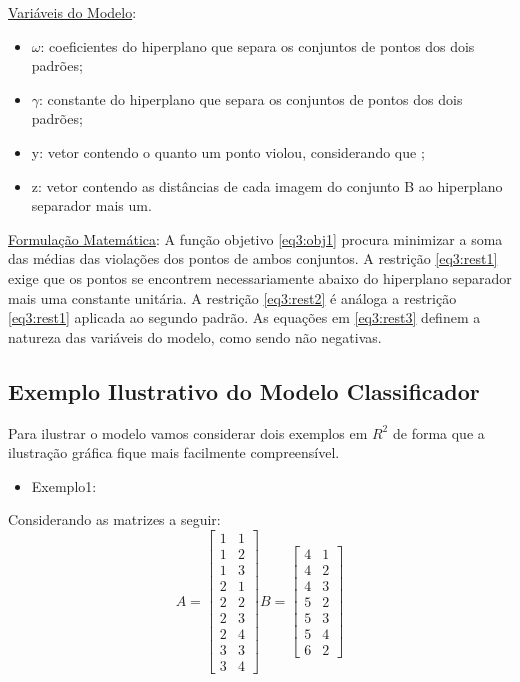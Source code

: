 \underline{Variáveis do Modelo}:
\begin{itemize}
\item{$\omega$}: coeficientes do hiperplano que separa os conjuntos de pontos dos dois padrões;
\item{$\gamma$}: constante do hiperplano que separa os conjuntos de pontos dos dois padrões;
\item{y}: vetor contendo o quanto um ponto violou, considerando que  ;
\item{z}: vetor contendo as distâncias de cada imagem do conjunto B ao hiperplano separador mais um.
\end{itemize}

\underline{Formulação Matemática}:
A função objetivo \ref{eq3:obj1} procura minimizar a soma das médias das violações dos pontos de ambos conjuntos. A restrição \ref{eq3:rest1} exige que os pontos se encontrem necessariamente abaixo do hiperplano separador mais uma constante unitária.  A restrição \ref{eq3:rest2} é análoga a restrição \ref{eq3:rest1} aplicada ao segundo padrão. As equações em \ref{eq3:rest3} definem a natureza das variáveis do modelo, como sendo não negativas.

\subsection{Exemplo Ilustrativo do Modelo Classificador}
Para ilustrar o modelo vamos considerar dois exemplos em $R^{2}$ \cite{Bennett92robustlinear} de forma que a ilustração gráfica fique mais facilmente compreensível.
\begin{itemize}
\item Exemplo1:
\end{itemize}

Considerando as matrizes a seguir:
$$A=\begin{bmatrix}1 & 1\\ 1 & 2\\ 1 & 3\\ 2 & 1\\ 2 & 2\\ 2 & 3\\ 2 & 4\\ 3 & 3\\ 3 & 4\end{bmatrix}
B=\begin{bmatrix}4 & 1\\ 4 & 2\\ 4 & 3\\ 5 & 2\\ 5 & 3\\ 5 & 4\\ 6 & 2\end{bmatrix}$$

